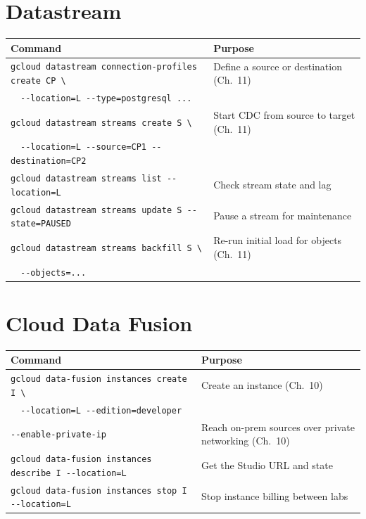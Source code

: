 \section{Datastream}
\begin{center}
\footnotesize
\begin{tabular}{@{}p{6.6cm}p{6.2cm}@{}}
\toprule
\textbf{Command} & \textbf{Purpose} \\
\midrule
\texttt{gcloud datastream connection-profiles create CP \textbackslash} & Define a source or destination (Ch.~11) \\
~~\texttt{-{}-location=L -{}-type=postgresql ...} & \\
\texttt{gcloud datastream streams create S \textbackslash} & Start CDC from source to target (Ch.~11) \\
~~\texttt{-{}-location=L -{}-source=CP1 -{}-destination=CP2} & \\
\texttt{gcloud datastream streams list -{}-location=L} & Check stream state and lag \\
\texttt{gcloud datastream streams update S -{}-state=PAUSED} & Pause a stream for maintenance \\
\texttt{gcloud datastream streams backfill S \textbackslash} & Re-run initial load for objects (Ch.~11) \\
~~\texttt{-{}-objects=...} & \\
\bottomrule
\end{tabular}
\end{center}

\section{Cloud Data Fusion}
\begin{center}
\footnotesize
\begin{tabular}{@{}p{6.6cm}p{6.2cm}@{}}
\toprule
\textbf{Command} & \textbf{Purpose} \\
\midrule
\texttt{gcloud data-fusion instances create I \textbackslash} & Create an instance (Ch.~10) \\
~~\texttt{-{}-location=L -{}-edition=developer} & \\
\texttt{-{}-enable-private-ip} & Reach on-prem sources over private networking (Ch.~10) \\
\texttt{gcloud data-fusion instances describe I -{}-location=L} & Get the Studio URL and state \\
\texttt{gcloud data-fusion instances stop I -{}-location=L} & Stop instance billing between labs \\
\bottomrule
\end{tabular}
\end{center}

